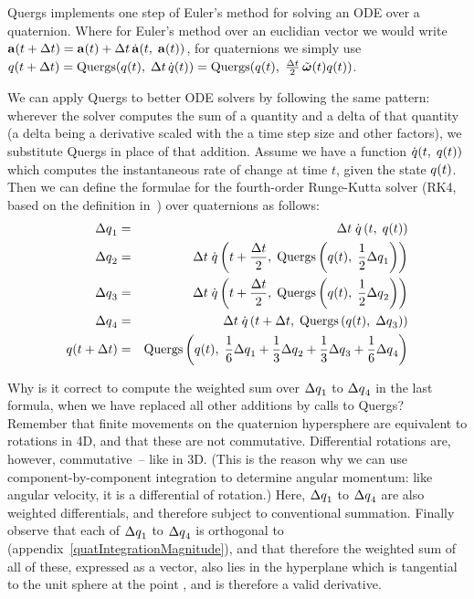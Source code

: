 Quergs implements one step of Euler's method for solving an ODE over a quaternion.
Where for Euler's method over an euclidian vector we would write
$\ve{a}(t + \Delta t) = \ve{a}(t) + \Delta t\,\dot{\ve{a}}(t,\;\ve{a}(t))$,
for quaternions we simply use
$\q{q}(t + \Delta t) = \mathrm{Quergs}(\q{q}(t),\; \Delta t\,\dot{\q{q}}(t)) =
    \mathrm{Quergs}(\q{q}(t),\; \frac{\Delta t}{2}\,\tilde{\ve{\omega}}(t)\q{q}(t))$.

We can apply Quergs to better ODE solvers by following the same pattern: wherever the solver
computes the sum of a quantity and a delta of that quantity (a delta being a derivative
scaled with the a time step size and other factors), we substitute Quergs in place of that
addition. Assume we have a function $\dot{\mbox{$q$}}(t,\; \mbox{$q$}(t))$ which computes the
instantaneous rate of change at time $t$, given the state $\mbox{$q$}(t)$. Then we can define
the formulae for the fourth-order Runge-Kutta solver (RK4, based on the definition
in~\cite{NRinC}) over quaternions as follows:
\begin{eqnarray*}
\Delta\mbox{$q$}_1 & = & \Delta t\;\dot{\mbox{$q$}}\left(t,\;\mbox{$q$}(t)\right) \\
\Delta\mbox{$q$}_2 & = & \Delta t\;\dot{\mbox{$q$}}\left(t + \frac{\Delta t}{2},\;
    \mathrm{Quergs}\left(\mbox{$q$}(t),\; \frac{1}{2}\Delta\mbox{$q$}_1\right)\right) \\
\Delta\mbox{$q$}_3 & = & \Delta t\;\dot{\mbox{$q$}}\left(t + \frac{\Delta t}{2},\;
    \mathrm{Quergs}\left(\mbox{$q$}(t),\; \frac{1}{2}\Delta\mbox{$q$}_2\right)\right) \\
\Delta\mbox{$q$}_4 & = & \Delta t\;\dot{\mbox{$q$}}\left(t + \Delta t,\;
    \mathrm{Quergs}\left(\mbox{$q$}(t),\; \Delta\mbox{$q$}_3\right)\right) \\
\mbox{$q$}(t + \Delta t) & = & \mathrm{Quergs}\left(\mbox{$q$}(t),\;
    \frac{1}{6}\Delta\mbox{$q$}_1 + \frac{1}{3}\Delta\mbox{$q$}_2 +
    \frac{1}{3}\Delta\mbox{$q$}_3 + \frac{1}{6}\Delta\mbox{$q$}_4\right)
\end{eqnarray*}

Why is it correct to compute the weighted sum over $\Delta\mbox{$q$}_1$ to
$\Delta\mbox{$q$}_4$ in the last formula, when we have replaced all other additions
by calls to Quergs? Remember that finite movements on the quaternion hypersphere are
equivalent to rotations in 4D, and that these are not commutative. Differential
rotations are, however, commutative~-- like in 3D. (This is the reason why we can
use component-by-component integration to determine angular momentum:
like angular velocity, it is a differential of rotation.) Here, $\Delta\mbox{$q$}_1$ to
$\Delta\mbox{$q$}_4$ are also weighted differentials, and therefore subject to
conventional summation. Finally observe that each of $\Delta\mbox{$q$}_1$ to
$\Delta\mbox{$q$}_4$ is orthogonal to  (appendix~\ref{quatIntegrationMagnitude}),
and that therefore the weighted sum of all of these, expressed as a vector, also
lies in the hyperplane which is tangential to the unit sphere at the point ,
and is therefore a valid derivative.
